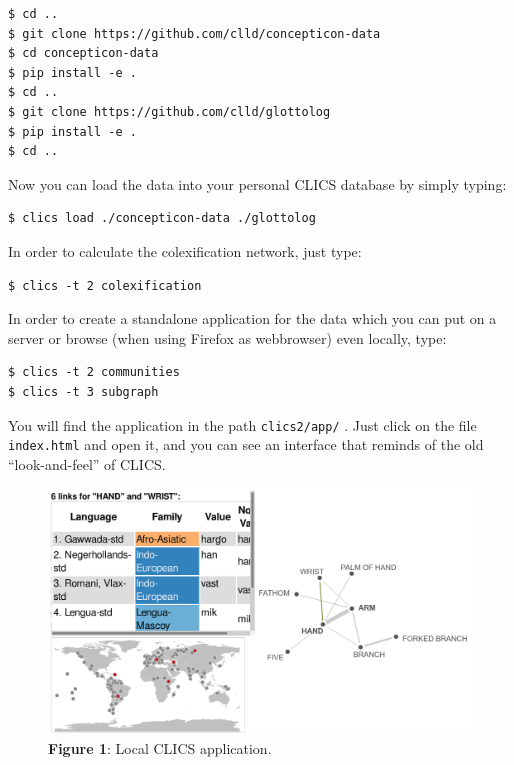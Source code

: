 \documentclass[
  a4paper,
  14pt,
  oneside,
  tablecaptionabove
]{scrbook}
\begin{document}
\begin{lstlisting}
$ cd ..
$ git clone https://github.com/clld/concepticon-data
$ cd concepticon-data
$ pip install -e .
$ cd ..
$ git clone https://github.com/clld/glottolog
$ pip install -e .
$ cd ..
\end{lstlisting}

Now you can load the data into your personal CLICS database by simply
typing:

\begin{lstlisting}
$ clics load ./concepticon-data ./glottolog
\end{lstlisting}

In order to calculate the colexification network, just type:

\begin{lstlisting}
$ clics -t 2 colexification
\end{lstlisting}

In order to create a standalone application for the data which you can
put on a server or browse (when using Firefox as webbrowser) even
locally, type:

\begin{lstlisting}
$ clics -t 2 communities
$ clics -t 3 subgraph
\end{lstlisting}

You will find the application in the path \lstinline!clics2/app/! . Just
click on the file \lstinline!index.html! and open it, and you can see an
interface that reminds of the old \enquote{look-and-feel} of CLICS.

\begin{figure}[htb]
\centering
\includegraphics[width=\textwidth]{images/clics-local.png}
\captionsetup{justification=centering}
\caption*{\small \textbf{Figure 1}: Local CLICS application.}
\end{figure}
\end{document}
